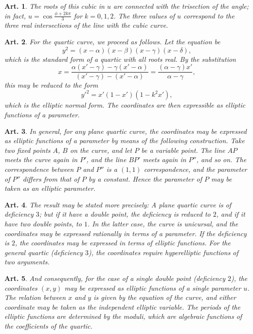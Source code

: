 \documentclass[12pt,a4paper]{article}
\theoremstyle{cayley}
\newtheorem{art}{Art.}[section]
\begin{document}
\begin{art}
The roots of this cubic in $u$ are connected with the trisection of the angle; in fact, $u = \cos\frac{\phi + 2k\pi}{3}$ for $k = 0, 1, 2$. The three values of $u$ correspond to the three real intersections of the line with the cubic curve.
\end{art}

\begin{art}
For the quartic curve, we proceed as follows. Let the equation be
\[
y^2 = (x - \alpha)(x - \beta)(x - \gamma)(x - \delta),
\]
which is the standard form of a quartic with all roots real. By the substitution
\[
x = \frac{\alpha(x' - \gamma) - \gamma(x' - \alpha)}{(x' - \gamma) - (x' - \alpha)}
= \frac{(\alpha - \gamma)x'}{\alpha - \gamma},
\]
this may be reduced to the form
\[
y'^2 = x'(1 - x')(1 - k^2x'),
\]
which is the elliptic normal form. The coordinates are then expressible as elliptic functions of a parameter.
\end{art}

\begin{art}
In general, for any plane quartic curve, the coordinates may be expressed as elliptic functions of a parameter by means of the following construction. Take two fixed points $A$, $B$ on the curve, and let $P$ be a variable point. The line $AP$ meets the curve again in $P'$, and the line $BP'$ meets again in $P''$, and so on. The correspondence between $P$ and $P''$ is a $(1,1)$ correspondence, and the parameter of $P''$ differs from that of $P$ by a constant. Hence the parameter of $P$ may be taken as an elliptic parameter.
\end{art}

\begin{art}
The result may be stated more precisely: A plane quartic curve is of deficiency $3$; but if it have a double point, the deficiency is reduced to $2$, and if it have two double points, to $1$. In the latter case, the curve is unicursal, and the coordinates may be expressed rationally in terms of a parameter. If the deficiency is $2$, the coordinates may be expressed in terms of elliptic functions. For the general quartic (deficiency $3$), the coordinates require hyperelliptic functions of two arguments.
\end{art}

\begin{art}
And consequently, for the case of a single double point (deficiency $2$), the coordinates $(x, y)$ may be expressed as elliptic functions of a single parameter $u$. The relation between $x$ and $y$ is given by the equation of the curve, and either coordinate may be taken as the independent elliptic variable. The periods of the elliptic functions are determined by the moduli, which are algebraic functions of the coefficients of the quartic.
\end{art}
\end{document}
